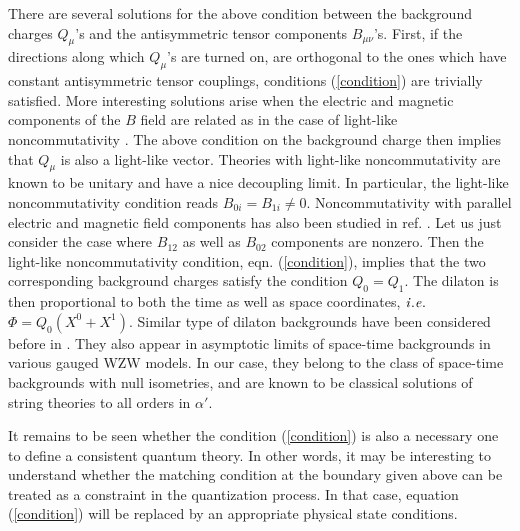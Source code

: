 \documentclass[a4paper,12pt]{article}
\begin{document}
There are several solutions for the above condition between the 
background charges $Q_{\mu}$'s and the antisymmetric tensor 
components $B_{\mu \nu}$'s.  First, if the directions along which 
$Q_{\mu}$'s are turned on, are orthogonal to the ones which have 
constant antisymmetric tensor couplings, conditions (\ref{condition}) are
trivially satisfied.  More interesting solutions arise 
when the electric and magnetic components of the $B$ field are related as 
in the case of light-like noncommutativity \cite{aharony}.
The above condition on the background charge then implies that 
$Q_{\mu}$ is also a light-like vector. 
Theories with light-like noncommutativity are known to be 
unitary \cite{gomis} and have a nice decoupling limit. 
In particular, the light-like noncommutativity condition reads 
$B_{0 i} = B_{1 i} \neq 0$. Noncommutativity with parallel electric 
and magnetic field components has also been studied in ref. 
\cite{jabbari}. Let us just consider the case where 
$B_{12}$ as well as $B_{02}$ components are nonzero. 
Then the light-like noncommutativity condition, 
eqn. (\ref{condition}), implies that the two corresponding
background charges satisfy the condition $Q_0 = Q_1$.
The dilaton is then proportional to both the time as well
as space coordinates, ${\it i. e.}$ $\Phi = Q_0 (X^0 + X^1)$.
Similar type of dilaton backgrounds have been considered before
in \cite{bershadsky}. They also appear in asymptotic limits 
of space-time backgrounds in various gauged WZW models.
In our case, they belong to the  class of 
space-time backgrounds with null isometries\cite{chiral}, and 
are known to be classical solutions of string theories to all 
orders in $\alpha'$. 
 
It remains to be seen whether the condition (\ref{condition})
is also a necessary one to define a consistent quantum theory. 
In other words, it may be interesting to understand
whether the matching condition at the boundary given above
can be treated as a constraint in the quantization process. 
In that case, equation (\ref{condition}) will be replaced by an  
appropriate physical state conditions. 
\end{document}
